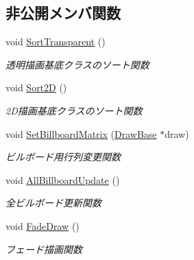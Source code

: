 \subsection*{非公開メンバ関数}
\begin{DoxyCompactItemize}
\item 
void \mbox{\hyperlink{class_back_buffer_af363b4d69affd48a1b0f65a000ff12b5}{Sort\+Transparent}} ()
\begin{DoxyCompactList}\small\item\em 透明描画基底クラスのソート関数 \end{DoxyCompactList}\item 
void \mbox{\hyperlink{class_back_buffer_a1530979126918a1a76b6555a5d9de9b8}{Sort2D}} ()
\begin{DoxyCompactList}\small\item\em 2\+D描画基底クラスのソート関数 \end{DoxyCompactList}\item 
void \mbox{\hyperlink{class_back_buffer_a5c9341c9d26576781ec9abb55b937bda}{Set\+Billboard\+Matrix}} (\mbox{\hyperlink{class_draw_base}{Draw\+Base}} $\ast$draw)
\begin{DoxyCompactList}\small\item\em ビルボード用行列変更関数 \end{DoxyCompactList}\item 
void \mbox{\hyperlink{class_back_buffer_a1b93b223c80549e7b11e1d91b56552bc}{All\+Billboard\+Update}} ()
\begin{DoxyCompactList}\small\item\em 全ビルボード更新関数 \end{DoxyCompactList}\item 
void \mbox{\hyperlink{class_back_buffer_a9835a5db9850f774a382c4f8e611b1d1}{Fade\+Draw}} ()
\begin{DoxyCompactList}\small\item\em フェード描画関数 \end{DoxyCompactList}\end{DoxyCompactItemize}
